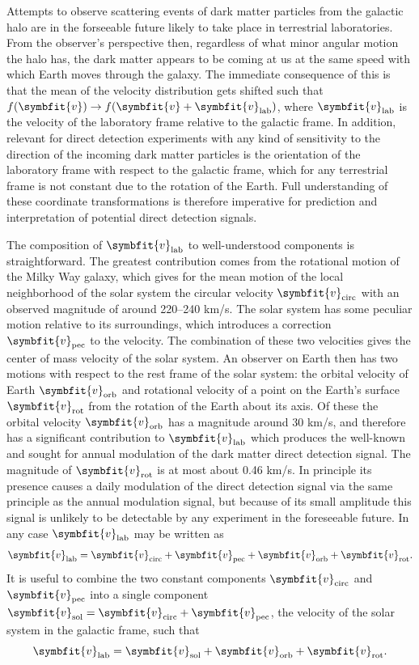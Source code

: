 \documentclass[b5paper, 10pt, twoside]{book}
\renewcommand{\vec}[1]{\symbfit{#1}}
\begin{document}
Attempts to observe scattering events of dark matter particles from the galactic halo are in the forseeable future likely to take place in terrestrial laboratories. From the observer's perspective then, regardless of what minor angular motion the halo has, the dark matter appears to be coming at us at the same speed with which Earth moves through the galaxy. The immediate consequence of this is that the mean of the velocity distribution gets shifted such that $f(\vec{v})\rightarrow f(\vec{v}+\vec{v}_\text{lab})$, where $\vec{v}_\text{lab}$ is the velocity of the laboratory frame relative to the galactic frame. In addition, relevant for direct detection experiments with any kind of sensitivity to the direction of the incoming dark matter particles is the orientation of the laboratory frame with respect to the galactic frame, which for any terrestrial frame is not constant due to the rotation of the Earth. Full understanding of these coordinate transformations is therefore imperative for prediction and interpretation of potential direct detection signals.

The composition of $\vec{v}_\text{lab}$ to well-understood components is straightforward. The greatest contribution comes from the rotational motion of the Milky Way galaxy, which gives for the mean motion of the local neighborhood of the solar system the circular velocity $\vec{v}_\text{circ}$ with an observed magnitude of around 220--240 km/s. The solar system has some peculiar motion relative to its surroundings, which introduces a correction $\vec{v}_\text{pec}$ to the velocity. The combination of these two velocities gives the center of mass velocity of the solar system. An observer on Earth then has two motions with respect to the rest frame of the solar system: the orbital velocity of Earth $\vec{v}_\text{orb}$ and rotational velocity of a point on the Earth's surface $\vec{v}_\text{rot}$ from the rotation of the Earth about its axis. Of these the orbital velocity $\vec{v}_\text{orb}$ has a magnitude around 30 km/s, and therefore has a significant contribution to $\vec{v}_\text{lab}$ which produces the well-known and sought for annual modulation of the dark matter direct detection signal. The magnitude of $\vec{v}_\text{rot}$ is at most about 0.46 km/s. In principle its presence causes a daily modulation of the direct detection signal via the same principle as the annual modulation signal, but because of its small amplitude this signal is unlikely to be detectable by any experiment in the foreseeable future. In any case $\vec{v}_\text{lab}$ may be written as
\begin{equation}
    \vec{v}_\text{lab}=\vec{v}_\text{circ}+\vec{v}_\text{pec}+\vec{v}_\text{orb}+\vec{v}_\text{rot}.
\end{equation}
It is useful to combine the two constant components $\vec{v}_\text{circ}$ and $\vec{v}_\text{pec}$ into a single component $\vec{v}_\text{sol}=\vec{v}_\text{circ}+\vec{v}_\text{pec}$, the velocity of the solar system in the galactic frame, such that
\begin{equation}
    \vec{v}_\text{lab}=\vec{v}_\text{sol}+\vec{v}_\text{orb}+\vec{v}_\text{rot}.
\end{equation}
\end{document}
